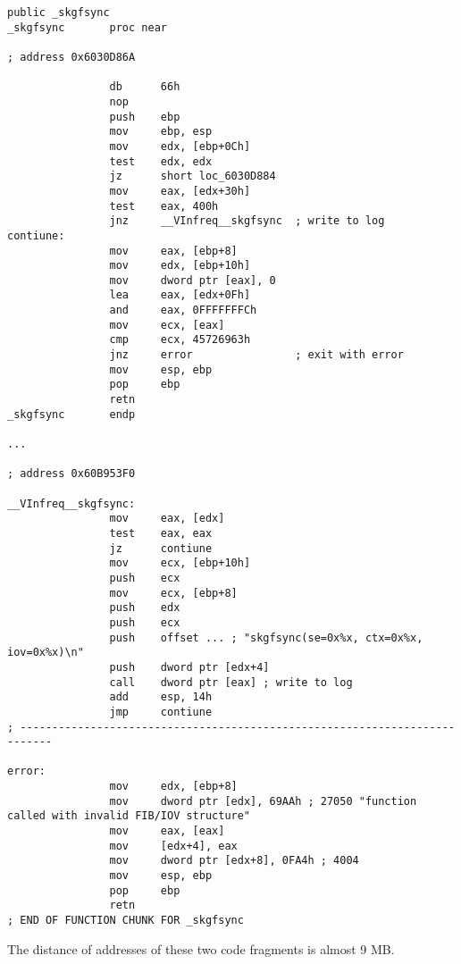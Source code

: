 \begin{lstlisting}[caption=orageneric11.dll (win32)]
                public _skgfsync
_skgfsync       proc near

; address 0x6030D86A

                db      66h
                nop
                push    ebp
                mov     ebp, esp
                mov     edx, [ebp+0Ch]
                test    edx, edx
                jz      short loc_6030D884
                mov     eax, [edx+30h]
                test    eax, 400h
                jnz     __VInfreq__skgfsync  ; write to log
contiune:
                mov     eax, [ebp+8]
                mov     edx, [ebp+10h]
                mov     dword ptr [eax], 0
                lea     eax, [edx+0Fh]
                and     eax, 0FFFFFFFCh
                mov     ecx, [eax]
                cmp     ecx, 45726963h
                jnz     error                ; exit with error
                mov     esp, ebp
                pop     ebp
                retn
_skgfsync       endp

...

; address 0x60B953F0

__VInfreq__skgfsync:
                mov     eax, [edx]
                test    eax, eax
                jz      contiune
                mov     ecx, [ebp+10h]
                push    ecx
                mov     ecx, [ebp+8]
                push    edx
                push    ecx
                push    offset ... ; "skgfsync(se=0x%x, ctx=0x%x, iov=0x%x)\n"
                push    dword ptr [edx+4]
                call    dword ptr [eax] ; write to log
                add     esp, 14h
                jmp     contiune
; ---------------------------------------------------------------------------

error:
                mov     edx, [ebp+8]
                mov     dword ptr [edx], 69AAh ; 27050 "function called with invalid FIB/IOV structure"
                mov     eax, [eax]
                mov     [edx+4], eax
                mov     dword ptr [edx+8], 0FA4h ; 4004
                mov     esp, ebp
                pop     ebp
                retn
; END OF FUNCTION CHUNK FOR _skgfsync
\end{lstlisting}

{The distance of addresses of these two code fragments is almost 9 MB}.

